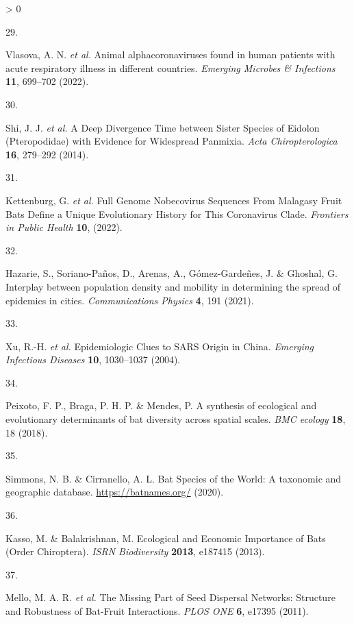 \documentclass[11pt]{article}
\newlength{\cslhangindent}
\newlength{\csllabelwidth}
\newenvironment{CSLReferences}[3] %
 {%
  \setlength{\parindent}{0pt}
  \ifodd #1 \everypar{\setlength{\hangindent}{\cslhangindent}}\ignorespaces\fi
  \ifnum #2 > 0
  \setlength{\parskip}{#2\baselineskip}
  \fi
 }%
 {}
\newcommand{\CSLLeftMargin}[1]{\parbox[t]{\maxof{\widthof{#1}}{\csllabelwidth}}{#1}}
\newcommand{\CSLRightInline}[1]{\parbox[t]{\linewidth}{#1}}
\begin{document}
\begin{CSLReferences}{0}{0}
\leavevmode\hypertarget{ref-Vlasova2022AniAlp}{}%
\CSLLeftMargin{29. }
\CSLRightInline{Vlasova, A. N. \emph{et al.} Animal alphacoronaviruses
found in human patients with acute respiratory illness in different
countries. \emph{Emerging Microbes \& Infections} \textbf{11}, 699--702
(2022).}

\leavevmode\hypertarget{ref-Shi2014DeeDiv}{}%
\CSLLeftMargin{30. }
\CSLRightInline{Shi, J. J. \emph{et al.} A Deep Divergence Time between
Sister Species of Eidolon (Pteropodidae) with Evidence for Widespread
Panmixia. \emph{Acta Chiropterologica} \textbf{16}, 279--292 (2014).}

\leavevmode\hypertarget{ref-Kettenburg2022FulGen}{}%
\CSLLeftMargin{31. }
\CSLRightInline{Kettenburg, G. \emph{et al.} Full Genome Nobecovirus
Sequences From Malagasy Fruit Bats Define a Unique Evolutionary History
for This Coronavirus Clade. \emph{Frontiers in Public Health}
\textbf{10}, (2022).}

\leavevmode\hypertarget{ref-Hazarie2021IntPop}{}%
\CSLLeftMargin{32. }
\CSLRightInline{Hazarie, S., Soriano-Paños, D., Arenas, A.,
Gómez-Gardeñes, J. \& Ghoshal, G. Interplay between population density
and mobility in determining the spread of epidemics in cities.
\emph{Communications Physics} \textbf{4}, 191 (2021).}

\leavevmode\hypertarget{ref-Xu2004EpiClu}{}%
\CSLLeftMargin{33. }
\CSLRightInline{Xu, R.-H. \emph{et al.} Epidemiologic Clues to SARS
Origin in China. \emph{Emerging Infectious Diseases} \textbf{10},
1030--1037 (2004).}

\leavevmode\hypertarget{ref-Peixoto2018SynEco}{}%
\CSLLeftMargin{34. }
\CSLRightInline{Peixoto, F. P., Braga, P. H. P. \& Mendes, P. A
synthesis of ecological and evolutionary determinants of bat diversity
across spatial scales. \emph{BMC ecology} \textbf{18}, 18 (2018).}

\leavevmode\hypertarget{ref-Simmons2020BatSpe}{}%
\CSLLeftMargin{35. }
\CSLRightInline{Simmons, N. B. \& Cirranello, A. L. Bat Species of the
World: A taxonomic and geographic database. \url{https://batnames.org/}
(2020).}

\leavevmode\hypertarget{ref-Kasso2013EcoEco}{}%
\CSLLeftMargin{36. }
\CSLRightInline{Kasso, M. \& Balakrishnan, M. Ecological and Economic
Importance of Bats (Order Chiroptera). \emph{ISRN Biodiversity}
\textbf{2013}, e187415 (2013).}

\leavevmode\hypertarget{ref-Mello2011MisPar}{}%
\CSLLeftMargin{37. }
\CSLRightInline{Mello, M. A. R. \emph{et al.} The Missing Part of Seed
Dispersal Networks: Structure and Robustness of Bat-Fruit Interactions.
\emph{PLOS ONE} \textbf{6}, e17395 (2011).}


\end{CSLReferences}
\end{document}
